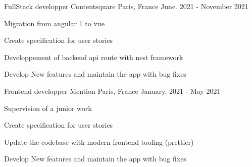 

\begin{cventries}
\cventry
{FullStack developper} %
{Contentsquare} %
{Paris, France} %
{June. 2021 - November 2021} %
{
  \begin{cvitems} %
    \item {Migration from angular 1 to vue}
    \item {Create specification for user stories}
    \item {Developpement of backend api route with nest framework}
    \item {Develop New features and maintain the app with bug fixes}
  \end{cvitems}
}
\cventry
{Frontend developper} %
{Mention} %
{Paris, France} %
{January. 2021 - May 2021} %
{
  \begin{cvitems} %
    \item {Supervision of a junior work}
    \item {Create specification for user stories}
    \item {Update the codebase with modern frontend tooling (prettier)}
    \item {Develop New features and maintain the app with bug fixes}
  \end{cvitems}
}


\end{cventries}
